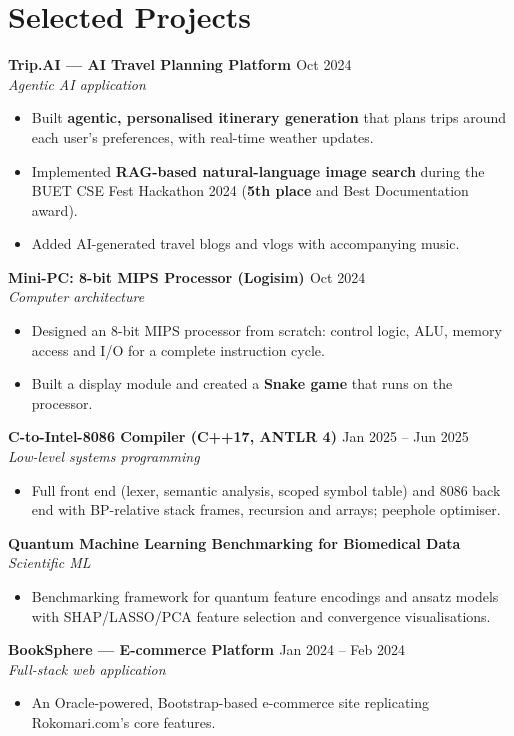 \documentclass[10pt,a4paper]{article}
\newcommand{\gh}[1]{\href{#1}{\textcolor{linkblue}{\faGithub}}}
\newcommand{\entry}[4]{%
  \textbf{#1}\hfill #2\\
  \textit{#3}\hfill\textit{#4}\par\vspace{1pt}}
\begin{document}
\section{Selected Projects}
\entry{Trip.AI --- AI Travel Planning Platform \gh{https://github.com/Apurbo5057/Trip.AI}}{Oct 2024}
      {Agentic AI application}{}
\begin{itemize}
  \item Built \textbf{agentic, personalised itinerary generation} that plans trips around each user's preferences, with real-time weather updates.
  \item Implemented \textbf{RAG-based natural-language image search} during the BUET CSE Fest Hackathon 2024 (\textbf{5th place} and Best Documentation award).
  \item Added AI-generated travel blogs and vlogs with accompanying music.
\end{itemize}
\vspace{2pt}
\entry{Mini-PC: 8-bit MIPS Processor (Logisim) \gh{https://github.com/Apurbo5057/Mini-PC}}{Oct 2024}
      {Computer architecture}{}
\begin{itemize}
  \item Designed an 8-bit MIPS processor from scratch: control logic, ALU, memory access and I/O for a complete instruction cycle.
  \item Built a display module and created a \textbf{Snake game} that runs on the processor.
\end{itemize}
\vspace{2pt}
\entry{C-to-Intel-8086 Compiler (C++17, ANTLR 4) \gh{https://github.com/Apurbo5057/C-Compiler}}{Jan 2025 -- Jun 2025}
      {Low-level systems programming}{}
\begin{itemize}
  \item Full front end (lexer, semantic analysis, scoped symbol table) and 8086 back end with BP-relative stack frames, recursion and arrays; peephole optimiser.
\end{itemize}
\vspace{2pt}
\entry{Quantum Machine Learning Benchmarking for Biomedical Data \gh{https://github.com/Apurbo5057/quantum-benchmarking}}{}
      {Scientific ML}{}
\begin{itemize}
  \item Benchmarking framework for quantum feature encodings and ansatz models with SHAP/LASSO/PCA feature selection and convergence visualisations.
\end{itemize}
\vspace{2pt}
\entry{BookSphere --- E-commerce Platform \gh{https://github.com/Apurbo5057/Project_BookSphere}}{Jan 2024 -- Feb 2024}
      {Full-stack web application}{}
\begin{itemize}
  \item An Oracle-powered, Bootstrap-based e-commerce site replicating Rokomari.com's core features.
\end{itemize}
 
\end{document}
